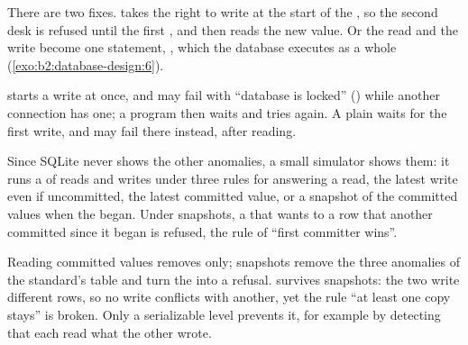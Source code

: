 There are two fixes.  takes the right to write at the start of the , so the second desk
is refused until the first , and then reads the new value. Or the read and the write become one statement,
, which the database executes as a whole
(\cref{exo:b2:database-design:6}).

\begin{inpractice}
 starts a write  at once, and may fail with ``database is locked'' ()
while another connection has one; a program then waits and tries again. A plain  waits for the first write,
and may fail there instead, after reading.
\end{inpractice}

Since SQLite never shows the other anomalies, a small simulator shows them: it runs a  of reads and writes under
three rules for answering a read, the latest write even if uncommitted, the latest committed value, or a snapshot of the
committed values when the  began. Under snapshots, a  that wants to  a row that another
 committed since it began is refused, the rule of ``first committer wins''.

\label{lst:b2:database-design:schedules}

\label{out:b2:database-design:schedules}

Reading committed values removes  only; snapshots remove the three anomalies of the standard's table and turn
the  into a refusal.  survives snapshots: the two  write different rows, so no write
conflicts with another, yet the rule ``at least one copy stays'' is broken. Only a serializable level prevents it, for
example by detecting that each read what the other wrote.

